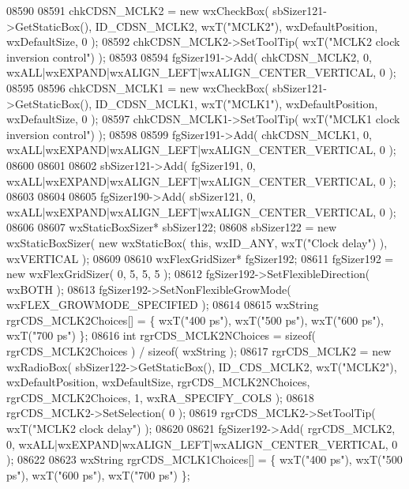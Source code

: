 \begin{DoxyCode}
08590     
08591     chkCDSN_MCLK2 = \textcolor{keyword}{new} wxCheckBox( sbSizer121->GetStaticBox(), ID_CDSN_MCLK2, wxT(\textcolor{stringliteral}{"MCLK2"}), 
      wxDefaultPosition, wxDefaultSize, 0 );
08592     chkCDSN_MCLK2->SetToolTip( wxT(\textcolor{stringliteral}{"MCLK2 clock inversion control"}) );
08593     
08594     fgSizer191->Add( chkCDSN_MCLK2, 0, wxALL|wxEXPAND|wxALIGN\_LEFT|wxALIGN\_CENTER\_VERTICAL, 0 );
08595     
08596     chkCDSN_MCLK1 = \textcolor{keyword}{new} wxCheckBox( sbSizer121->GetStaticBox(), ID_CDSN_MCLK1, wxT(\textcolor{stringliteral}{"MCLK1"}), 
      wxDefaultPosition, wxDefaultSize, 0 );
08597     chkCDSN_MCLK1->SetToolTip( wxT(\textcolor{stringliteral}{"MCLK1 clock inversion control"}) );
08598     
08599     fgSizer191->Add( chkCDSN_MCLK1, 0, wxALL|wxEXPAND|wxALIGN\_LEFT|wxALIGN\_CENTER\_VERTICAL, 0 );
08600     
08601     
08602     sbSizer121->Add( fgSizer191, 0, wxALL|wxEXPAND|wxALIGN\_LEFT|wxALIGN\_CENTER\_VERTICAL, 0 );
08603     
08604     
08605     fgSizer190->Add( sbSizer121, 0, wxALL|wxEXPAND|wxALIGN\_LEFT|wxALIGN\_CENTER\_VERTICAL, 0 );
08606     
08607     wxStaticBoxSizer* sbSizer122;
08608     sbSizer122 = \textcolor{keyword}{new} wxStaticBoxSizer( \textcolor{keyword}{new} wxStaticBox( \textcolor{keyword}{this}, wxID\_ANY, wxT(\textcolor{stringliteral}{"Clock delay"}) ), wxVERTICAL );
08609     
08610     wxFlexGridSizer* fgSizer192;
08611     fgSizer192 = \textcolor{keyword}{new} wxFlexGridSizer( 0, 5, 5, 5 );
08612     fgSizer192->SetFlexibleDirection( wxBOTH );
08613     fgSizer192->SetNonFlexibleGrowMode( wxFLEX\_GROWMODE\_SPECIFIED );
08614     
08615     wxString rgrCDS\_MCLK2Choices[] = \{ wxT(\textcolor{stringliteral}{"400 ps"}), wxT(\textcolor{stringliteral}{"500 ps"}), wxT(\textcolor{stringliteral}{"600 ps"}), wxT(\textcolor{stringliteral}{"700 ps"}) \};
08616     \textcolor{keywordtype}{int} rgrCDS\_MCLK2NChoices = \textcolor{keyword}{sizeof}( rgrCDS\_MCLK2Choices ) / \textcolor{keyword}{sizeof}( wxString );
08617     rgrCDS_MCLK2 = \textcolor{keyword}{new} wxRadioBox( sbSizer122->GetStaticBox(), ID_CDS_MCLK2, wxT(\textcolor{stringliteral}{"MCLK2"}), 
      wxDefaultPosition, wxDefaultSize, rgrCDS\_MCLK2NChoices, rgrCDS\_MCLK2Choices, 1, wxRA\_SPECIFY\_COLS );
08618     rgrCDS_MCLK2->SetSelection( 0 );
08619     rgrCDS_MCLK2->SetToolTip( wxT(\textcolor{stringliteral}{"MCLK2 clock delay"}) );
08620     
08621     fgSizer192->Add( rgrCDS_MCLK2, 0, wxALL|wxEXPAND|wxALIGN\_LEFT|wxALIGN\_CENTER\_VERTICAL, 0 );
08622     
08623     wxString rgrCDS\_MCLK1Choices[] = \{ wxT(\textcolor{stringliteral}{"400 ps"}), wxT(\textcolor{stringliteral}{"500 ps"}), wxT(\textcolor{stringliteral}{"600 ps"}), wxT(\textcolor{stringliteral}{"700 ps"}) \};

\end{DoxyCode}
